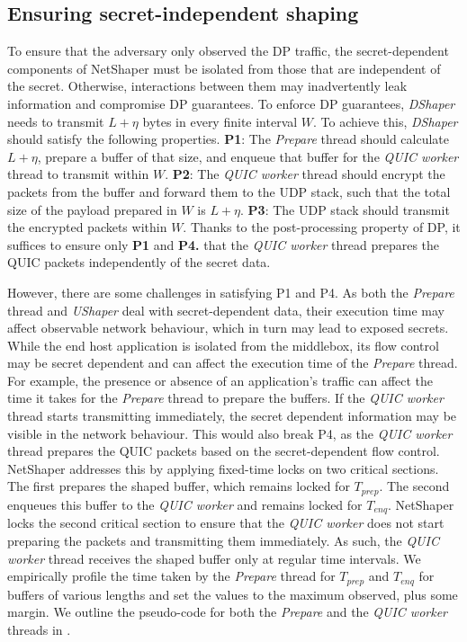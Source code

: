 \subsection{Ensuring secret-independent shaping}
\label{subsec:netshaper-secret-independent-shaping-implementation}

To ensure that the adversary only observed the DP traffic, the secret-dependent components of NetShaper must be isolated from those that are independent of the secret. 
Otherwise, interactions between them may inadvertently leak information and compromise DP guarantees.
To enforce DP guarantees, \textit{DShaper} needs to transmit $L + \eta$ bytes in every finite interval $W$.
To achieve this, \textit{DShaper} should satisfy the following properties.
\textbf{P1}: The \textit{Prepare} thread should calculate $L + \eta$, prepare a buffer of that size, and enqueue that buffer for the \textit{QUIC worker} thread to transmit within $W$.
\textbf{P2}: The \textit{QUIC worker} thread should encrypt the packets from the buffer and forward them to the UDP stack, such that the total size of the payload prepared in $W$ is $L + \eta$.
\textbf{P3}: The UDP stack should transmit the encrypted packets within $W$.
Thanks to the post-processing property of DP, it suffices to ensure only \textbf{P1} and \textbf{P4.} that the \textit{QUIC worker} thread prepares the QUIC packets independently of the secret data.

However, there are some challenges in satisfying P1 and P4.
As both the \textit{Prepare} thread and \textit{UShaper} deal with secret-dependent data, their execution time may affect observable network behaviour, which in turn may lead to exposed secrets.
While the end host application is isolated from the middlebox, its flow control may be secret dependent and can affect the execution time of the \textit{Prepare} thread.
For example, the presence or absence of an application's traffic can affect the time it takes for the \textit{Prepare} thread to prepare the buffers.
If the \textit{QUIC worker} thread starts transmitting immediately, the secret dependent information may be visible in the network behaviour. 
This would also break P4, as the \textit{QUIC worker} thread prepares the QUIC packets based on the secret-dependent flow control.
NetShaper addresses this by applying fixed-time locks on two critical sections.
The first prepares the shaped buffer, which remains locked for $T_{prep}$.
The second enqueues this buffer to the \textit{QUIC worker} and remains locked for $T_{enq}$.
NetShaper locks the second critical section to ensure that the \textit{QUIC worker} does not start preparing the packets and transmitting them immediately.
As such, the \textit{QUIC worker} thread receives the shaped buffer only at regular time intervals.
We empirically profile the time taken by the \textit{Prepare} thread for $T_{prep}$ and $T_{enq}$ for buffers of various lengths and set the values to the maximum observed, plus some margin.
We outline the pseudo-code for both the \textit{Prepare} and the \textit{QUIC worker} threads in .


